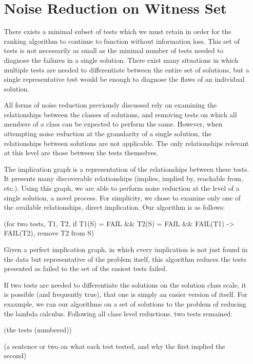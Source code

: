 \documentclass[11pt]{article}
\begin{document}
\section{Noise Reduction on Witness Set}

There exists a minimal subset of tests which we must retain in order for the ranking algorithm to continue to function without information loss. This set of tests is not necessarily as small as the minimal number of tests needed to diagnose the failures in a single solution. There exist many situations in which multiple tests are needed to differentiate between the entire set of solutions, but a single representative test would be enough to diagnose the flaws of an individual solution.

All forms of noise reduction previously discussed rely on examining the relationships between the classes of solutions, and removing tests on which all members of a  class can be expected to perform the same. However, when attempting noise reduction at the granularity of a single solution, the relationships between solutions are not applicable. The only relationships relevant at this level  are those between the tests themselves.

The implication graph is a representation of the relationships between these tests. It presents many discoverable relationships (implies, implied by, reachable from, etc.). Using this graph, we are able to perform noise reduction at the level of a single solution, a novel process. For simplicity, we chose to examine only one of the available relationships, direct implication. Our algorithm is as follows:

(for two tests, T1, T2, if T1(S) = FAIL \&\& T2(S) = FAIL \&\& FAIL(T1) -> FAIL(T2), remove T2 from S)

Given a perfect implication graph, in which every implication is not just found in the data but representative of the problem itself, this algorithm reduces the tests presented as  failed to the set of the easiest tests failed. 

If two tests are needed to differentiate the solutions on the solution class scale, it is possible (and frequently true), that one is simply an easier version of itself. For exaxmple, we ran our algorithms on a set of solutions to the problem of reducing the lambda calculus. Following all class level reductions, two tests remained:

(the tests (numbered))

(a sentence or two on what each test tested,  and why the first implied the second)
\end{document}
